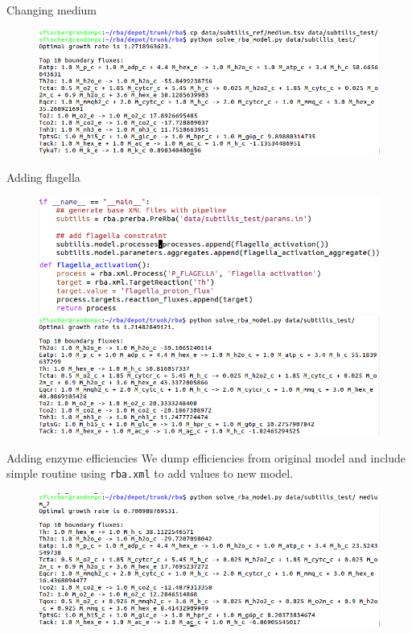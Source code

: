 \documentclass{beamer}
\begin{document}
\begin{frame}{Changing medium}
  \begin{figure}
    \centering
    \includegraphics[width=\linewidth]{added_medium}
  \end{figure}
\end{frame}

\begin{frame}{Adding flagella}
  \begin{figure}
    \centering
    \includegraphics[width=0.9\linewidth]{added_flagella_code_1} \\
    \includegraphics[width=0.9\linewidth]{added_flagella_code_2} \\
    \includegraphics[width=0.9\linewidth]{added_flagella_solver}
  \end{figure}
\end{frame}

\begin{frame}{Adding enzyme efficiencies}
  We dump efficiencies from original model and include simple routine using
  \texttt{rba.xml} to add values to new model.
  \begin{figure}
    \centering
    \includegraphics[width=\linewidth]{added_enzyme_efficiencies}
  \end{figure}
\end{frame}
\end{document}
